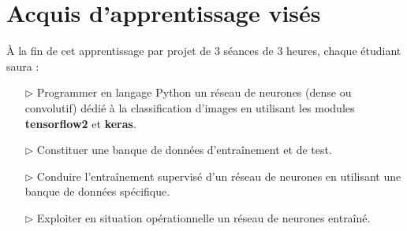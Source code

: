 \documentclass[11pt,french]{article}
\begin{document}

\renewcommand{\ttdefault}[0]{lmtt}
\newcommand{\boldtt}[1]{{\ttfamily\bfseries #1}}

\newcommand{\QtLogo}[0]{\texttt{[image: Images/QtLogo.projet]}}
\newcommand{\PyQt}[0]{\boldtt{PyQt5}}
\newcommand{\Qt}[0]{\boldtt{Qt}}

\begin{center}
\setlength{\fboxsep}{5mm}
\setlength{\fboxrule}{0.2mm}

\medskip
{}
\end{center}

\section*{Acquis d'apprentissage visés}

À la fin de cet apprentissage par projet de 3 séances de 3 heures, chaque étudiant saura :
\begin{itemize}
\item[$\rhd$] Programmer en langage Python un réseau de neurones (dense ou convolutif) dédié à la classification d'images
  en utilisant les modules \boldtt{tensorflow2} et \boldtt{keras}.
\item[$\rhd$] Constituer une banque de données d'entraînement et de test.
\item[$\rhd$] Conduire l'entraînement supervisé d'un réseau de neurones en utilisant une banque de données spécifique.
\item[$\rhd$] Exploiter en situation opérationnelle un réseau de neurones entraîné.
\end{itemize}

\newpage
\vspace*{-16mm}
\end{document}

